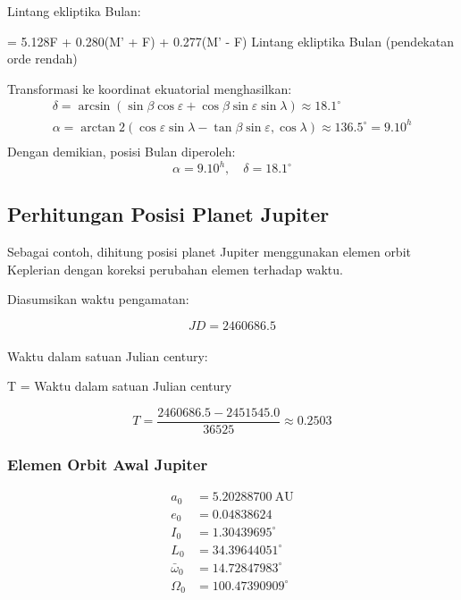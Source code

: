 Lintang ekliptika Bulan:
\begin{equationcaptioned}[eq:3.lintangEkliptikaBulan]{
		\beta =
		5.128\sin F
		+ 0.280\sin(M' + F)
		+ 0.277\sin(M' - F)
	}{
		Lintang ekliptika Bulan (pendekatan orde rendah)
	}
\end{equationcaptioned}




Transformasi ke koordinat ekuatorial menghasilkan:
{\setlength{\abovedisplayskip}{8pt}%
	\setlength{\belowdisplayskip}{8pt}%
\[
\begin{split}
\delta = \arcsin(\sin\beta\cos\varepsilon + \cos\beta\sin\varepsilon\sin\lambda)
\approx 18.1^\circ\\
\alpha = \arctan2(\cos\varepsilon\sin\lambda - \tan\beta\sin\varepsilon,\cos\lambda)
\approx 136.5^\circ = 9.10^h\\
\end{split}
\]
}
Dengan demikian, posisi Bulan diperoleh:
{\setlength{\abovedisplayskip}{8pt}%
	\setlength{\belowdisplayskip}{8pt}%
\[
\alpha = 9.10^h,\quad \delta = 18.1^\circ
\]
}
\subsection{Perhitungan Posisi Planet Jupiter}

Sebagai contoh, dihitung posisi planet Jupiter menggunakan elemen orbit Keplerian dengan koreksi perubahan elemen terhadap waktu.

Diasumsikan waktu pengamatan:

{\setlength{\abovedisplayskip}{8pt}%
\setlength{\belowdisplayskip}{8pt}%
\[
JD = 2460686.5
\]
}\\

Waktu dalam satuan Julian century:

\begin{equationcaptioned}{
T = 
}{
Waktu dalam satuan Julian century
}
\end{equationcaptioned}

{\setlength{\abovedisplayskip}{8pt}%
\setlength{\belowdisplayskip}{8pt}%
\[
T =
\frac{2460686.5 - 2451545.0}{36525}
\approx 0.2503
\]
}



\subsubsection*{Elemen Orbit Awal Jupiter}

{\setlength{\abovedisplayskip}{8pt}%
\setlength{\belowdisplayskip}{8pt}%
\[
\begin{split}
a_0 &= 5.20288700\ \text{AU} \\
e_0 &= 0.04838624 \\
I_0 &= 1.30439695^\circ \\
L_0 &= 34.39644051^\circ \\
\bar{\omega}_0 &= 14.72847983^\circ \\
\Omega_0 &= 100.47390909^\circ
\end{split}
\]
}

